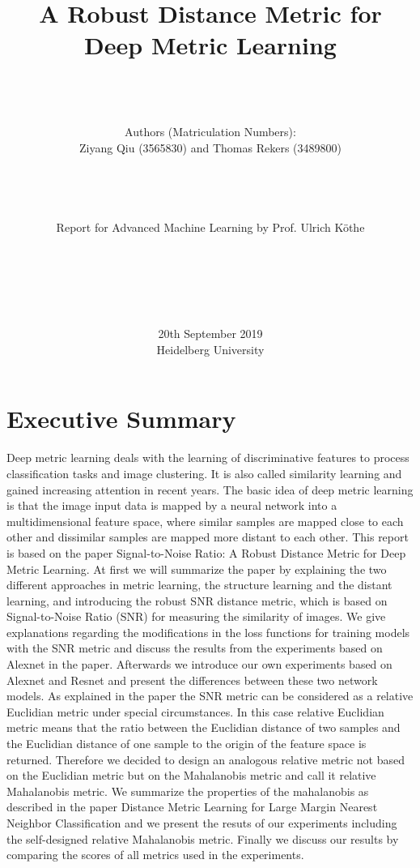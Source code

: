 \documentclass[12pt,paper=a4]{scrartcl}
\title{A Robust Distance Metric for Deep Metric Learning}
\author{\\ \\ \\Authors (Matriculation Numbers): \\
Ziyang Qiu (3565830) and Thomas Rekers (3489800) \\ \\ \\ \\ \\ Report for Advanced Machine Learning by Prof. Ulrich Köthe \\ \\ \\ \\ \\ \\}
\date{20th September 2019 \\ Heidelberg University}
\theoremstyle{break}
\begin{document}
\maketitle
\vfill
\thispagestyle{empty}
\cleardoublepage

\tableofcontents
\thispagestyle{empty}
\cleardoublepage

\setcounter{page}{1}
\section{Executive Summary}
Deep metric learning deals with the learning of discriminative features to process classification tasks and image clustering. It is also called similarity learning and gained increasing attention in recent years. The basic idea of deep metric learning is that the image input data is mapped by a neural network into a multidimensional feature space, where similar samples are mapped close to each other and dissimilar samples are mapped more distant to each other. This report is based on the paper Signal-to-Noise Ratio: A Robust Distance Metric for Deep Metric Learning. At first we will summarize the paper by explaining the two different approaches in metric learning, the structure learning and the distant learning, and introducing the robust SNR distance metric, which is based on Signal-to-Noise Ratio (SNR) for measuring the similarity of images. We give explanations regarding the modifications in the loss functions for training models with the SNR metric and discuss the results from the experiments based on Alexnet in the paper. Afterwards we introduce our own experiments based on Alexnet and Resnet and present the differences between these two network models. As explained in the paper the SNR metric can be considered as a relative Euclidian metric under special circumstances. In this case relative Euclidian metric means that the ratio between the Euclidian distance of two samples and the Euclidian distance of one sample to the origin of the feature space is returned. Therefore we decided to design an analogous relative metric not based on the Euclidian metric but on the Mahalanobis metric and call it relative Mahalanobis metric. We summarize the properties of the mahalanobis as described in the paper Distance Metric Learning for Large Margin Nearest Neighbor Classification and we present the resuts of our experiments including the self-designed relative Mahalanobis metric. Finally we discuss our results by comparing the scores of all metrics used in the experiments.
\end{document}
